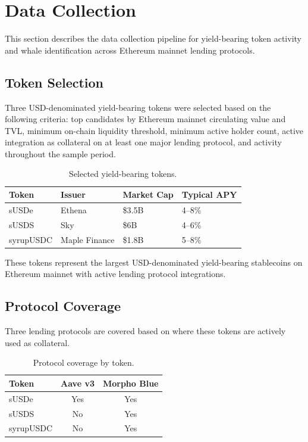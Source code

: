 \section{Data Collection}
\label{sec:data}

This section describes the data collection pipeline for yield-bearing token activity and whale identification across Ethereum mainnet lending protocols.

\subsection{Token Selection}

Three USD-denominated yield-bearing tokens were selected based on the following criteria: top candidates by Ethereum mainnet circulating value and TVL, minimum on-chain liquidity threshold, minimum active holder count, active integration as collateral on at least one major lending protocol, and activity throughout the sample period.

\begin{table}[h]
\centering
\caption{Selected yield-bearing tokens.}
\label{tab:tokens}
\begin{tabular}{llll}
\hline
\textbf{Token} & \textbf{Issuer} & \textbf{Market Cap} & \textbf{Typical APY} \\
\hline
sUSDe & Ethena & \$3.5B & 4--8\% \\
sUSDS & Sky & \$6B & 4--6\% \\
syrupUSDC & Maple Finance & \$1.8B & 5--8\% \\
\hline
\end{tabular}
\end{table}

These tokens represent the largest USD-denominated yield-bearing stablecoins on Ethereum mainnet with active lending protocol integrations.

\subsection{Protocol Coverage}

Three lending protocols are covered based on where these tokens are actively used as collateral.

\begin{table}[h]
\centering
\caption{Protocol coverage by token.}
\label{tab:protocols}
\begin{tabular}{lcc}
\hline
\textbf{Token} & \textbf{Aave v3} & \textbf{Morpho Blue} \\
\hline
sUSDe & Yes & Yes \\
sUSDS & No & Yes \\
syrupUSDC & No & Yes \\
\hline
\end{tabular}
\end{table}

